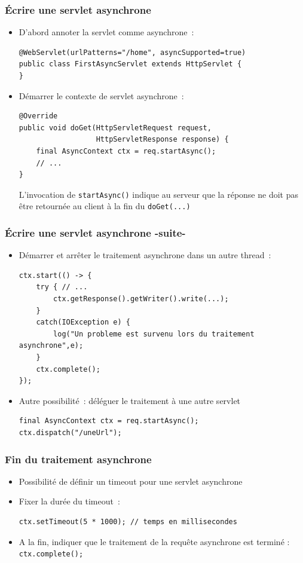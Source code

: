 \documentclass{beamer}
\begin{document}
\begin{frame}[fragile]
	\frametitle{Écrire une servlet asynchrone}
	\begin{itemize}
		\item D'abord annoter la servlet comme asynchrone~:
\begin{lstlisting}
@WebServlet(urlPatterns="/home", asyncSupported=true)
public class FirstAsyncServlet extends HttpServlet {
}
\end{lstlisting}
\item Démarrer le contexte de servlet asynchrone~:
\begin{lstlisting}
@Override
public void doGet(HttpServletRequest request,
                  HttpServletResponse response) {
	final AsyncContext ctx = req.startAsync();
	// ...
}
\end{lstlisting}
L'invocation de \texttt{startAsync()} indique au serveur que la réponse ne doit pas être retournée au client à la fin du \texttt{doGet(...)}
	\end{itemize}
\end{frame}

\begin{frame}[fragile]
	\frametitle{Écrire une servlet asynchrone -suite-}
	\begin{itemize}
		\item Démarrer et arrêter le traitement asynchrone dans un autre thread~:
\begin{lstlisting}
ctx.start(() -> {
	try { // ...
		ctx.getResponse().getWriter().write(...);
	}
	catch(IOException e) {
		log("Un probleme est survenu lors du traitement asynchrone",e);
	}
	ctx.complete();
});
\end{lstlisting}
\item Autre possibilité~: déléguer le traitement à une autre servlet
\begin{lstlisting}
final AsyncContext ctx = req.startAsync();
ctx.dispatch("/uneUrl");
\end{lstlisting}
	\end{itemize}
\end{frame}

\begin{frame}[fragile]
	\frametitle{Fin du traitement asynchrone}
	\begin{itemize}
		\item Possibilité de définir un timeout pour une servlet asynchrone
		\item Fixer la durée du timeout~:
\begin{lstlisting}
ctx.setTimeout(5 * 1000); // temps en millisecondes 
\end{lstlisting}
	\item A la fin, indiquer que le traitement de la requête asynchrone est terminé : \texttt{ctx.complete();}
	\end{itemize}
\end{frame}
\end{document}
